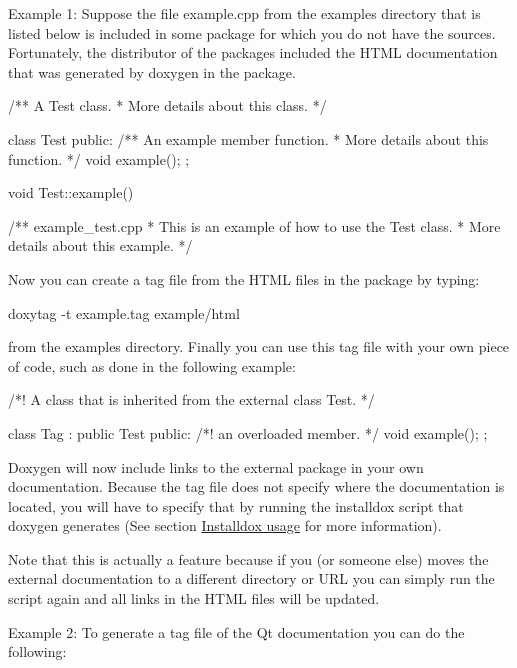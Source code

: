 \begin{DoxyParagraph}{Example 1:}
Suppose the file {\ttfamily example.cpp} from the {\ttfamily examples} directory that is listed below is included in some package for which you do not have the sources. Fortunately, the distributor of the packages included the HTML documentation that was generated by doxygen in the package. 
\begin{DoxyVerbInclude}
/** A Test class.
 *  More details about this class.
 */

class Test
{
  public:
    /** An example member function.
     *  More details about this function.
     */
    void example();
};

void Test::example() {}

/** \example example_test.cpp
 * This is an example of how to use the Test class.
 * More details about this example.
 */
\end{DoxyVerbInclude}
 Now you can create a tag file from the HTML files in the package by typing: \begin{DoxyVerb}
doxytag -t example.tag example/html
\end{DoxyVerb}
 from the examples directory. Finally you can use this tag file with your own piece of code, such as done in the following example: 
\begin{DoxyVerbInclude}
/*! A class that is inherited from the external class Test.
*/

class Tag : public Test
{
  public:
    /*! an overloaded member. */
    void example();
};
\end{DoxyVerbInclude}
 Doxygen will now include links to the external package in your own documentation. Because the tag file does not specify where the documentation is located, you will have to specify that by running the installdox script that doxygen generates (See section \hyperlink{installdox_usage}{Installdox usage} for more information).
\end{DoxyParagraph}
Note that this is actually a feature because if you (or someone else) moves the external documentation to a different directory or URL you can simply run the script again and all links in the HTML files will be updated.



\begin{DoxyParagraph}{Example 2:}
To generate a tag file of the Qt documentation you can do the following: 
 
\end{DoxyParagraph}
